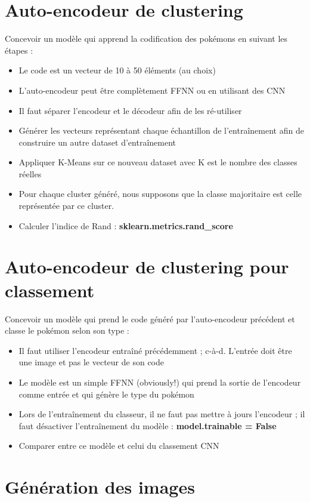 \documentclass[11pt, a4paper]{article}
\begin{document}
\section*{Auto-encodeur de clustering}

Concevoir un modèle qui apprend la codification des pokémons en suivant les étapes : 
\begin{itemize}
	\item Le code est un vecteur de 10 à 50 éléments (au choix)
	\item L'auto-encodeur peut être complètement FFNN ou en utilisant des CNN
	\item Il faut séparer l'encodeur et le décodeur afin de les ré-utiliser
	\item Générer les vecteurs représentant chaque échantillon de l'entraînement afin de construire un autre dataset d'entraînement
	\item Appliquer K-Means sur ce nouveau dataset avec K est le nombre des classes réelles
	\item Pour chaque cluster généré, nous supposons que la classe majoritaire est celle représentée par ce cluster.
	\item Calculer l'indice de Rand : \textbf{sklearn.metrics.rand\_score}
\end{itemize}

\section*{Auto-encodeur de clustering pour classement}

Concevoir un modèle qui prend le code généré par l'auto-encodeur précédent et classe le pokémon selon son type : 
\begin{itemize}
	\item Il faut utiliser l'encodeur entraîné précédemment ; c-à-d. L'entrée doit être une image et pas le vecteur de son code
	\item Le modèle est un simple FFNN (obviously!) qui prend la sortie de l'encodeur comme entrée et qui génère le type du pokémon
	\item Lors de l'entraînement du classeur, il ne faut pas mettre à jours l'encodeur ; il faut désactiver l'entraînement du modèle : \textbf{model.trainable = False} 
	\item Comparer entre ce modèle et celui du classement CNN 
\end{itemize}

\section*{Génération des images}
\end{document}
